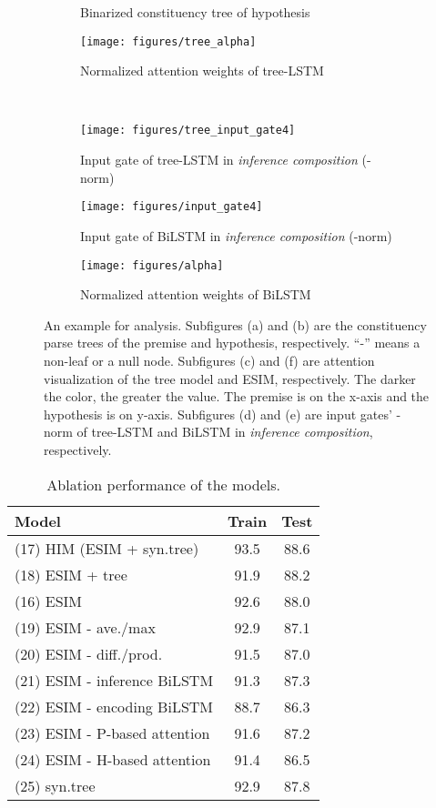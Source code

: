 \documentclass[11pt,a4paper]{article}
\begin{document}
\begin{figure*}[!ht]
\begin{subfigure}[b]{0.58\textwidth}
\begin{tikzpicture}
        \end{tikzpicture}
		\caption{Binarized constituency tree of hypothesis}
		\label{fig:tree_hypothesis}
		\texttt{[image: figures/tree\_alpha]}
		\caption{Normalized attention weights of tree-LSTM}
		\label{fig:tree_alpha}	
	\end{subfigure}
	~ \begin{subfigure}[b]{0.40\textwidth}
		\texttt{[image: figures/tree\_input\_gate4]}
		\caption{Input gate of tree-LSTM in \textit{inference composition} (-norm)}
		\label{fig:tree_input_gate4}
		\texttt{[image: figures/input\_gate4]}
		\caption{Input gate of BiLSTM in \textit{inference composition} (-norm)}
		\label{fig:input_gate4}
        \center
		\texttt{[image: figures/alpha]}
		\caption{Normalized attention weights of BiLSTM}
		\label{fig:alpha}		
	\end{subfigure}
	\caption{An example for analysis. Subfigures (a) and (b) are the constituency parse trees of the premise and hypothesis, respectively. ``-'' means a non-leaf or a null node. Subfigures (c) and (f) are attention visualization of the tree model and ESIM, respectively. The darker the color, the greater the value. The premise is on the x-axis and the hypothesis is on y-axis. Subfigures (d) and (e) are input gates' -norm of tree-LSTM and BiLSTM in \textit{inference composition}, respectively. }
	\label{fig:visualization}
\end{figure*}

\begin{table}[h]
	\renewcommand{\arraystretch}{0.9}
    \setlength{\tabcolsep}{0.3em}
	\centering
	\begin{tabular}{lcc}
		\toprule
		Model      &  Train  &  Test  \\
		\midrule
		(17) HIM (ESIM + syn.tree) & 93.5 & 88.6 \\
		(18) ESIM + tree & 91.9 & 88.2 \\
		(16) ESIM  & 92.6 & 88.0 \\
		(19) ESIM - ave./max & 92.9 & 87.1\\
		(20) ESIM - diff./prod. & 91.5 & 87.0\\
        (21) ESIM - inference BiLSTM & 91.3 & 87.3\\
        (22) ESIM - encoding BiLSTM & 88.7 & 86.3\\
        (23) ESIM - P-based attention & 91.6 & 87.2\\
        (24) ESIM - H-based attention & 91.4 & 86.5\\
        (25) syn.tree   & 92.9 & 87.8\\
		\bottomrule
	\end{tabular}
    \caption{Ablation performance of the models. } 	
	\label{tab:ablation}
\end{table}
\end{document}
